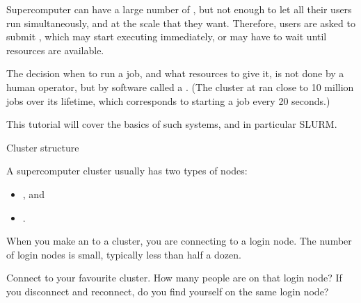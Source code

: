 
Supercomputer  can have a large number of
, but not enough to let all their users run
simultaneously, and at the scale that they want.
Therefore, users are asked to submit ,
which may start executing immediately,
or may have to wait
until resources are available.

The decision when to run a job,
and what resources to give it,
is not done by a human
operator, but by software called a .
(The  cluster at 
ran close to 10 million jobs over its lifetime,
which corresponds to starting a job every 20 seconds.)

This tutorial will cover the basics of such systems, and in particular
\acf{SLURM}.

 {Cluster structure}

A supercomputer cluster usually has two types of nodes:
\begin{itemize}
\item {}, and
\item {}.
\end{itemize}
When you make an  to a cluster,
you are connecting to a login node. The number of login nodes
is small, typically less than half a dozen.

\begin{exercise}
  Connect to your favourite cluster. How many people are on that login node?
  If you disconnect and reconnect, do you find yourself on the same login node?
\end{exercise}

